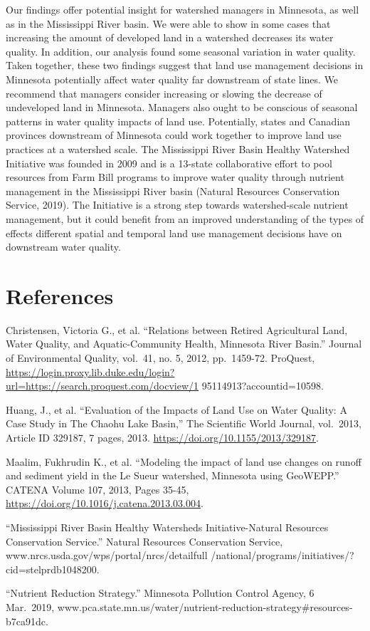 \documentclass[12pt,]{article}
\begin{document}
Our findings offer potential insight for watershed managers in
Minnesota, as well as in the Mississippi River basin. We were able to
show in some cases that increasing the amount of developed land in a
watershed decreases its water quality. In addition, our analysis found
some seasonal variation in water quality. Taken together, these two
findings suggest that land use management decisions in Minnesota
potentially affect water quality far downstream of state lines. We
recommend that managers consider increasing or slowing the decrease of
undeveloped land in Minnesota. Managers also ought to be conscious of
seasonal patterns in water quality impacts of land use. Potentially,
states and Canadian provinces downstream of Minnesota could work
together to improve land use practices at a watershed scale. The
Mississippi River Basin Healthy Watershed Initiative was founded in 2009
and is a 13-state collaborative effort to pool resources from Farm Bill
programs to improve water quality through nutrient management in the
Mississippi River basin (Natural Resources Conservation Service, 2019).
The Initiative is a strong step towards watershed-scale nutrient
management, but it could benefit from an improved understanding of the
types of effects different spatial and temporal land use management
decisions have on downstream water quality.

\newpage

\hypertarget{references}{%
\section{References}\label{references}}

 Christensen, Victoria G., et al. ``Relations between Retired
Agricultural Land, Water Quality, and Aquatic-Community Health,
Minnesota River Basin.'' Journal of Environmental Quality, vol.~41, no.
5, 2012, pp.~1459-72. ProQuest,
\url{https://login.proxy.lib.duke.edu/login?url=https://search.proquest.com/docview/1}
95114913?accountid=10598.

Huang, J., et al. ``Evaluation of the Impacts of Land Use on Water
Quality: A Case Study in The Chaohu Lake Basin,'' The Scientific World
Journal, vol.~2013, Article ID 329187, 7 pages, 2013.
\url{https://doi.org/10.1155/2013/329187}.

Maalim, Fukhrudin K., et al. ``Modeling the impact of land use changes
on runoff and sediment yield in the Le Sueur watershed, Minnesota using
GeoWEPP.'' CATENA Volume 107, 2013, Pages 35-45,
\url{https://doi.org/10.1016/j.catena.2013.03.004}.

``Mississippi River Basin Healthy Watersheds Initiative-Natural
Resources Conservation Service.'' Natural Resources Conservation
Service, www.nrcs.usda.gov/wps/portal/nrcs/detailfull
/national/programs/initiatives/?cid=stelprdb1048200.

``Nutrient Reduction Strategy.'' Minnesota Pollution Control Agency, 6
Mar.~2019,
www.pca.state.mn.us/water/nutrient-reduction-strategy\#resources-b7ca91dc.
\end{document}
